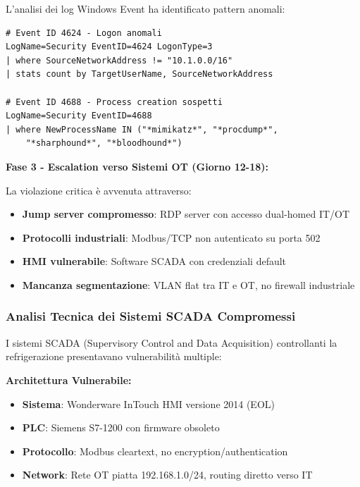 L'analisi dei log Windows Event ha identificato pattern anomali:
\begin{lstlisting}[caption={Indicatori di Movimento Laterale},label={lst:lateral_movement}]
# Event ID 4624 - Logon anomali
LogName=Security EventID=4624 LogonType=3
| where SourceNetworkAddress != "10.1.0.0/16"
| stats count by TargetUserName, SourceNetworkAddress

# Event ID 4688 - Process creation sospetti
LogName=Security EventID=4688
| where NewProcessName IN ("*mimikatz*", "*procdump*", 
    "*sharphound*", "*bloodhound*")
\end{lstlisting}

\textbf{Fase 3 - Escalation verso Sistemi OT (Giorno 12-18):}

La violazione critica è avvenuta attraverso:
\begin{itemize}
    \item \textbf{Jump server compromesso}: RDP server con accesso dual-homed IT/OT
    \item \textbf{Protocolli industriali}: Modbus/TCP non autenticato su porta 502
    \item \textbf{HMI vulnerabile}: Software SCADA con credenziali default
    \item \textbf{Mancanza segmentazione}: VLAN flat tra IT e OT, no firewall industriale
\end{itemize}

\subsubsection{\texorpdfstring{Analisi Tecnica dei Sistemi SCADA Compromessi}{4.5.1.2 - Analisi Tecnica dei Sistemi SCADA Compromessi}}

I sistemi SCADA (Supervisory Control and Data Acquisition) controllanti la refrigerazione presentavano vulnerabilità multiple:

\textbf{Architettura Vulnerabile:}
\begin{itemize}
    \item \textbf{Sistema}: Wonderware InTouch HMI versione 2014 (EOL)
    \item \textbf{PLC}: Siemens S7-1200 con firmware obsoleto
    \item \textbf{Protocollo}: Modbus cleartext, no encryption/authentication
    \item \textbf{Network}: Rete OT piatta 192.168.1.0/24, routing diretto verso IT
\end{itemize}

